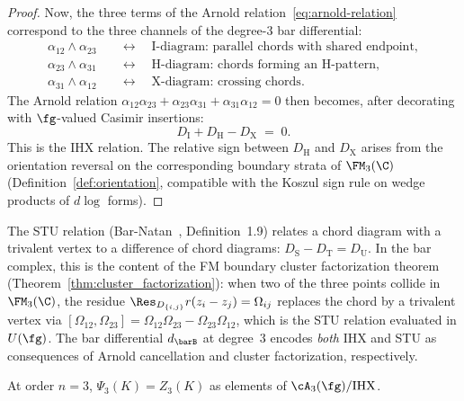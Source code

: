 \begin{proof}
Now, the three terms of the Arnold
relation~\eqref{eq:arnold-relation} correspond to the three
channels of the degree-$3$ bar differential:
\begin{align}
\alpha_{12} \wedge \alpha_{23}
 &\quad\longleftrightarrow\quad
 \text{I-diagram: parallel chords with shared endpoint},
 \label{eq:I-channel} \\
\alpha_{23} \wedge \alpha_{31}
 &\quad\longleftrightarrow\quad
 \text{H-diagram: chords forming an H-pattern},
 \label{eq:H-channel} \\
\alpha_{31} \wedge \alpha_{12}
 &\quad\longleftrightarrow\quad
 \text{X-diagram: crossing chords}.
 \label{eq:X-channel}
\end{align}
The Arnold relation
$\alpha_{12}\alpha_{23} + \alpha_{23}\alpha_{31}
+ \alpha_{31}\alpha_{12} = 0$ then becomes, after decorating
with $\fg$-valued Casimir insertions:
\begin{equation}\label{eq:IHX-from-Arnold}
\boxed{
D_{\mathrm{I}} + D_{\mathrm{H}} - D_{\mathrm{X}} \;=\; 0.}
\end{equation}
This is the IHX relation. The relative sign between
$D_{\mathrm{H}}$ and $D_{\mathrm{X}}$ arises from the
orientation reversal on the corresponding boundary strata of
$\FM_3(\C)$
(Definition~\ref{def:orientation}, compatible with the Koszul
sign rule on wedge products of $d\log$ forms).
\end{proof}

\begin{remark}
\label{rem:STU-from-bar}
The STU relation
(Bar-Natan~\cite{BarNatan95}, Definition~1.9) relates a chord
diagram with a trivalent vertex to a difference of chord
diagrams:
$D_{\mathrm{S}} - D_{\mathrm{T}} = D_{\mathrm{U}}$.
	In the bar complex, this is the content of the FM boundary
	cluster factorization theorem
(Theorem~\ref{thm:cluster_factorization}):
when two of the three points collide in $\FM_3(\C)$, the
residue $\Res_{D_{\{i,j\}}} r(z_i - z_j) = \Omega_{ij}$
replaces the chord by a trivalent vertex via
$[\Omega_{12}, \Omega_{23}] = \Omega_{12}\Omega_{23}
- \Omega_{23}\Omega_{12}$,
which is the STU relation evaluated in $U(\fg)$. The bar
differential $d_{\barB}$ at degree~$3$ encodes \emph{both}
IHX and STU as consequences of Arnold cancellation and
cluster factorization, respectively.
\end{remark}

\begin{proposition}
\label{prop:order-3-match}
At order $n = 3$, $\Psi_3(K) = Z_3(K)$ as elements of
$\cA_3(\fg)/\mathrm{IHX}$.
\end{proposition}


